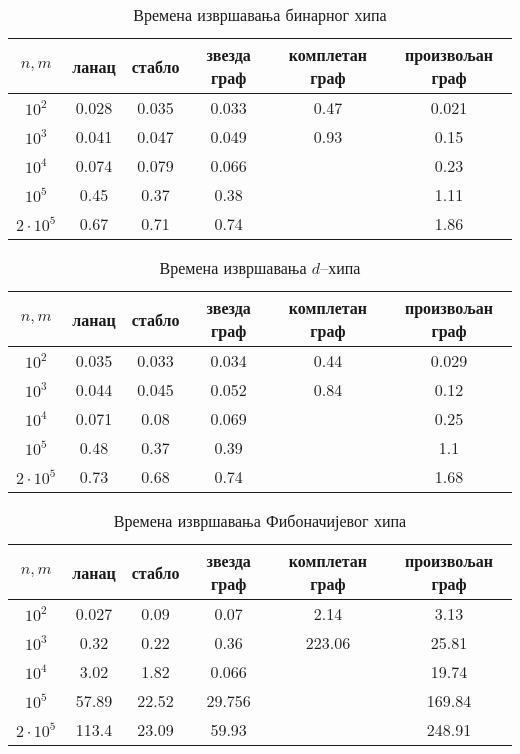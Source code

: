 \documentclass[11pt, a4paper]{article}
\theoremstyle{remark}
\numberwithin{equation}{section}
\begin{document}
	\begin{center}
		\begin{table}[H]
			\centering
			\caption{Времена извршавања бинарног хипа}
			\begin{tabular}{cccccc} \toprule 
				$n, m$ & ланац & стабло & звезда граф & комплетан граф & произвољан граф\\ \midrule
				$10^2$ & 0.028 & 0.035 & 0.033 & 0.47 & 0.021\\ 
				$10^3$ & 0.041 & 0.047 & 0.049 & 0.93 & 0.15\\
				$10^4$ & 0.074 & 0.079 & 0.066 & & 0.23\\
				$10^5$ & 0.45 & 0.37 & 0.38 & & 1.11\\
				$2\cdot 10^5$ & 0.67 & 0.71 & 0.74 & & 1.86\\
				\bottomrule
			\end{tabular}
		\end{table}
	\end{center}
	\begin{center}
	\begin{table}[H]
		\centering
		\caption{Времена извршавања $d$--хипа}
		\begin{tabular}{cccccc} \toprule
			$n, m$ & ланац & стабло & звезда граф & комплетан граф & произвољан граф\\ \midrule
			$10^2$ & 0.035 & 0.033 & 0.034 & 0.44 & 0.029\\ 
			$10^3$ & 0.044 & 0.045 & 0.052 & 0.84 & 0.12\\
			$10^4$ & 0.071 & 0.08 & 0.069 & & 0.25\\
			$10^5$ & 0.48 & 0.37 & 0.39 & & 1.1\\
			$2\cdot 10^5$ & 0.73 & 0.68 & 0.74 & & 1.68\\
			\bottomrule
		\end{tabular}
	\end{table}
	\end{center}
	\begin{center}
	\begin{table}[H]
		\centering
		\caption{Времена извршавања Фибоначијевог хипа}
		\begin{tabular}{cccccc} \toprule 
			$n, m$ & ланац & стабло & звезда граф & комплетан граф & произвољан граф\\ \midrule
			$10^2$ & 0.027 & 0.09 & 0.07 & 2.14 & 3.13\\ 
			$10^3$ & 0.32 & 0.22 & 0.36 & 223.06 & 25.81\\
			$10^4$ & 3.02 & 1.82 & 0.066 & & 19.74\\
			$10^5$ & 57.89 & 22.52 & 29.756 & & 169.84\\
			$2\cdot 10^5$ & 113.4 & 23.09 & 59.93 & & 248.91\\
			\bottomrule
		\end{tabular}
	\end{table}
	\end{center}
\end{document}
